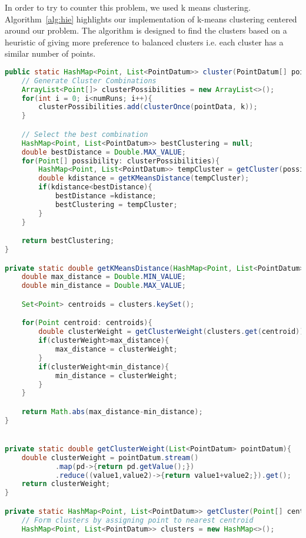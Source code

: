 In order to try to counter this problem, we used k means clustering. Algorithm~\ref{alg:hie} highlights our implementation of k-means clustering centered around our problem. The algorithm is designed to find the clusters based on a heuristic of giving more preference to balanced clusters i.e. each cluster has a similar number of points.


\begin{lstlisting}[language=JAVA, caption=Algorithm for K means, label=alg:kmeans]
public static HashMap<Point, List<PointDatum>> cluster(PointDatum[] pointData, int k, int numRuns){
    // Generate Cluster Combinations
    ArrayList<Point[]> clusterPossibilities = new ArrayList<>();
    for(int i = 0; i<numRuns; i++){
        clusterPossibilities.add(clusterOnce(pointData, k));
    }

    // Select the best combination
    HashMap<Point, List<PointDatum>> bestClustering = null;
    double bestDistance = Double.MAX_VALUE;
    for(Point[] possibility: clusterPossibilities){
        HashMap<Point, List<PointDatum>> tempCluster = getCluster(possibility, pointData);
        double kdistance = getKMeansDistance(tempCluster);
        if(kdistance<bestDistance){
            bestDistance =kdistance;
            bestClustering = tempCluster;
        }
    }

    return bestClustering;
}

private static double getKMeansDistance(HashMap<Point, List<PointDatum>> clusters){
    double max_distance = Double.MIN_VALUE;
    double min_distance = Double.MAX_VALUE;

    Set<Point> centroids = clusters.keySet();

    for(Point centroid: centroids){
        double clusterWeight = getClusterWeight(clusters.get(centroid));
        if(clusterWeight>max_distance){
            max_distance = clusterWeight;
        }
        if(clusterWeight<min_distance){
            min_distance = clusterWeight;
        }
    }

    return Math.abs(max_distance-min_distance);
}


private static double getClusterWeight(List<PointDatum> pointDatum){
    double clusterWeight = pointDatum.stream()
            .map(pd->{return pd.getValue();})
            .reduce((value1,value2)->{return value1+value2;}).get();
    return clusterWeight;
}

private static HashMap<Point, List<PointDatum>> getCluster(Point[] centroids, PointDatum[] pointData){
    // Form clusters by assigning point to nearest centroid
    HashMap<Point, List<PointDatum>> clusters = new HashMap<>();


\end{lstlisting}
